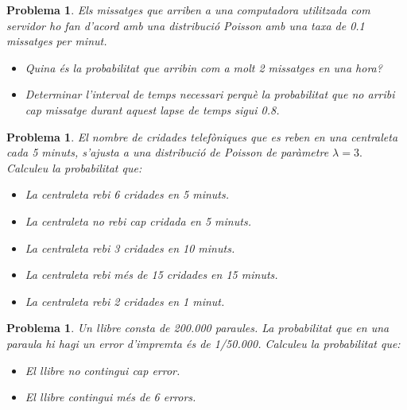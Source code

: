 \documentclass[11pt]{article}
\newcounter{prbcont}
\newtheorem{problema}[prbcont]{Problema}
\newcommand{\sol}[1]{{\textbf{\footnotetext[\the\problemes]{Sol.: #1} }}}
\begin{document}
\begin{problema}
Els missatges que arriben a una computadora utilitzada com servidor ho fan d'acord amb una distribuci\'o Poisson amb una taxa de 0.1 missatges per minut. 
\begin{itemize}
\item Quina \'es la probabilitat que arribin com a molt 2 missatges en una hora? 
\item Determinar l'interval de temps necessari perqu\`e la probabilitat que no arribi cap missatge durant aquest lapse de temps sigui 0.8.
\end{itemize} %
\end{problema}

\begin{problema}
El nombre de cridades telef\`oniques que es reben en una centraleta cada 5 minuts,
s'ajusta a una distribuci\'o de Poisson de par\`ametre $\lambda = 3.$ Calculeu la probabilitat
que:
\begin{itemize}
\item [(a)] La centraleta rebi 6 cridades en 5 minuts. %
\item [(b)] La centraleta no rebi cap cridada en 5 minuts. %
\item [(c)] La centraleta rebi 3 cridades en 10 minuts. %
\item [(d)] La centraleta rebi m\'es de 15 cridades en 15 minuts. %
\item [(e)] La centraleta rebi 2 cridades en 1 minut. %
\end{itemize}
\end{problema}

\begin{problema}
Un llibre consta de 200.000 paraules. La probabilitat que en una paraula hi hagi un
error d'impremta \'es de 1/50.000. Calculeu la probabilitat que:
\begin{itemize}
\item [(a)] El llibre no contingui cap error. %
\item [(b)] El llibre contingui m\'es de 6 errors. %
\end{itemize}
\end{problema}

\end{document}
